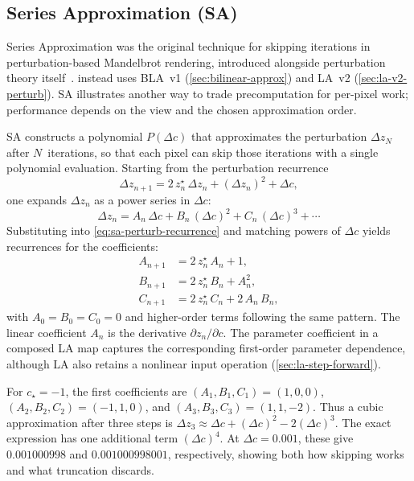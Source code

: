 \subsection{Series Approximation (SA)}
\label{subsec:series-approx}

Series Approximation was the original technique for skipping iterations
in perturbation-based Mandelbrot rendering, introduced alongside
perturbation theory itself~\cite{Martin2013Perturbation}.  \FractalShark{} instead uses BLA~v1
(\cref{sec:bilinear-approx}) and LA~v2
(\cref{sec:la-v2-perturb}).  SA illustrates another way to trade
precomputation for per-pixel work; performance depends on the view and the
chosen approximation order.

SA constructs a polynomial $P(\Delta c)$ that approximates the
perturbation $\Delta z_N$ after $N$~iterations, so that each pixel can
skip those iterations with a single polynomial evaluation.  Starting
from the perturbation recurrence
\begin{equation}
  \Delta z_{n+1} = 2\,z_n^\star\,\Delta z_n + (\Delta z_n)^2 + \Delta c,
  \label{eq:sa-perturb-recurrence}
\end{equation}
one expands $\Delta z_n$ as a power series in $\Delta c$:
\[
  \Delta z_n = A_n\,\Delta c + B_n\,(\Delta c)^2
             + C_n\,(\Delta c)^3 + \cdots
\]
Substituting into \cref{eq:sa-perturb-recurrence} and matching powers of
$\Delta c$ yields recurrences for the coefficients:
\begin{align}
  A_{n+1} &= 2\,z_n^\star\,A_n + 1,
    \label{eq:sa-A} \\
  B_{n+1} &= 2\,z_n^\star\,B_n + A_n^2,
    \label{eq:sa-B} \\
  C_{n+1} &= 2\,z_n^\star\,C_n + 2\,A_n\,B_n,
    \label{eq:sa-C}
\end{align}
with $A_0=B_0=C_0=0$ and higher-order terms following the same pattern.
The linear coefficient $A_n$ is the derivative $\partial z_n/\partial c$.
The parameter coefficient in a composed LA map captures the corresponding
first-order parameter dependence, although LA also retains a nonlinear input
operation (\cref{sec:la-step-forward}).

For $c_\star=-1$, the first coefficients are
$(A_1,B_1,C_1)=(1,0,0)$,
$(A_2,B_2,C_2)=(-1,1,0)$, and
$(A_3,B_3,C_3)=(1,1,-2)$.
Thus a cubic approximation after three steps is
$\Delta z_3\approx\Delta c+(\Delta c)^2-2(\Delta c)^3$.
The exact expression has one additional term $(\Delta c)^4$.
At $\Delta c=0.001$, these give $0.001000998$ and
$0.001000998001$, respectively, showing both how skipping works and what
truncation discards.


